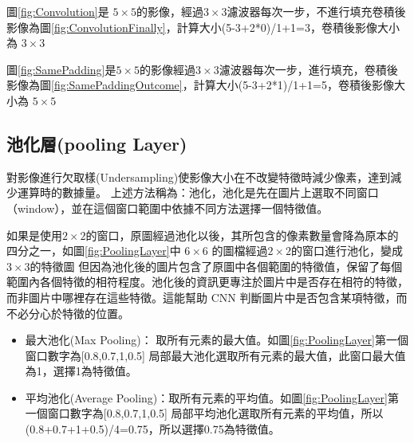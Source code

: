 圖\ref{fig:Convolution}是 \(5 \times5\)的影像，經過\(3 \times 3\)濾波器每次一步，不進行填充卷積後影像為圖\ref{fig:ConvolutionFinally}，計算大小(5-3+2*0)/1+1=3，卷積後影像大小為 \(3 \times 3\) 


圖\ref{fig:SamePadding}是\(5 \times 5\)的影像經過\(3 \times 3\)濾波器每次一步，進行填充，卷積後影像為圖\ref{fig:SamePaddingOutcome}，計算大小(5-3+2*1)/1+1=5，卷積後影像大小為 \(5 \times 5\)




\subsection{池化層(pooling Layer)}
對影像進行欠取樣(Undersampling)使影像大小在不改變特徵時減少像素，達到減少運算時的數據量。
上述方法稱為：池化，池化是先在圖片上選取不同窗口（window），並在這個窗口範圍中依據不同方法選擇一個特徵值。

如果是使用\(2 \times 2\)的窗口，原圖經過池化以後，其所包含的像素數量會降為原本的四分之一，如圖\ref{fig:PoolingLayer}中 \(6 \times6\) 的圖檔經過\(2 \times 2\)的窗口進行池化，變成\(3 \times 3\)的特徵圖
但因為池化後的圖片包含了原圖中各個範圍的特徵值，保留了每個範圍內各個特徵的相符程度。池化後的資訊更專注於圖片中是否存在相符的特徵，而非圖片中哪裡存在這些特徵。這能幫助 CNN 判斷圖片中是否包含某項特徵，而不必分心於特徵的位置。

\begin{itemize}
	\item
	      最大池化(Max Pooling)：
取所有元素的最大值。如圖\ref{fig:PoolingLayer}第一個窗口數字為[0.8,0.7,1,0.5] 局部最大池化選取所有元素的最大值，此窗口最大值為1，選擇1為特徵值。
	\item

	      平均池化(Average Pooling)：取所有元素的平均值。如圖\ref{fig:PoolingLayer}第一個窗口數字為[0.8,0.7,1,0.5] 局部平均池化選取所有元素的平均值，所以(0.8+0.7+1+0.5)/4=0.75，所以選擇0.75為特徵值。
\end{itemize}




